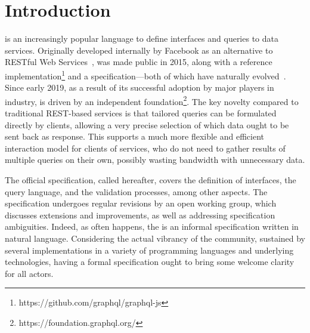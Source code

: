 \section{Introduction}

\gql is an increasingly popular language to define interfaces and queries to data services. Originally developed internally by Facebook as an alternative to RESTful Web Services~\cite{restful}, \gql was made public in 2015, along with a reference implementation\footnote{https://github.com/graphql/graphql-js} and a specification---both of which have naturally evolved~\cite{gqlspec}. %
Since early 2019, as a result of its successful adoption by major players in industry,
\gql is driven by an independent foundation\footnote{https://foundation.graphql.org/}. The key novelty compared to traditional REST-based services is that tailored queries can be formulated directly by clients, allowing a very precise selection of which data ought to be sent back as response. This supports a much more flexible and efficient interaction model for clients of services, who do not need to gather results of multiple queries on their own, possibly wasting bandwidth with unnecessary data.


The official \gql specification, called \spec hereafter, 
covers the definition of interfaces, the query language, and the validation processes, among other aspects. The specification undergoes regular revisions by an open working group, which discusses extensions and improvements, as well as addressing specification ambiguities. Indeed, as often happens, the \spec is an informal specification written in natural language.
Considering the actual vibrancy of the \gql community, sustained by several implementations in a variety of programming languages and underlying technologies, having a formal specification ought to bring some welcome clarity for all actors.

